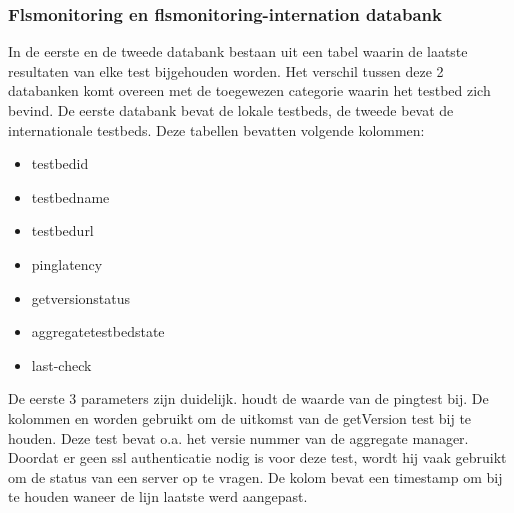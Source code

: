 \subsubsection{Flsmonitoring en flsmonitoring-internation databank}
\npar
In de eerste en de tweede databank bestaan uit een tabel waarin de laatste resultaten van elke test bijgehouden worden. Het verschil tussen deze 2 databanken komt overeen met de toegewezen categorie waarin het testbed zich bevind. De eerste databank bevat de lokale testbeds, de tweede bevat de internationale testbeds. Deze tabellen bevatten volgende kolommen:
\begin{itemize}
\item testbedid
\item testbedname
\item testbedurl
\item pinglatency
\item getversionstatus
\item aggregatetestbedstate
\item last-check
\end{itemize}
 De eerste 3 parameters zijn duidelijk.  houdt de waarde van de pingtest bij.
De kolommen  en  worden gebruikt om de uitkomst van de getVersion test bij te houden. Deze test bevat o.a. het versie nummer van de aggregate manager. Doordat er geen ssl authenticatie nodig is voor deze test, wordt hij vaak gebruikt om de status van een server op te vragen. De kolom  bevat een timestamp om bij te houden waneer de lijn laatste werd aangepast.
